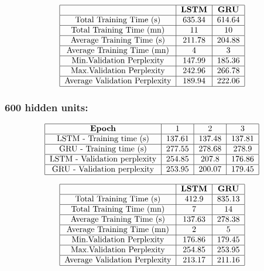 \documentclass[11pt]{article}
\newcommand{\0}{\mat{0}}
\begin{document}
\begin{itemize}
\begin{enumerate}
	  \[
  	 	\begin{tabular}{| c | c | c |}
  	 	 	\hline
	 	 		& \textbf{LSTM} &  \textbf{GRU} \\
	  	 	\hline
	 			Total Training Time (s)		& 635.34 & 614.64 \\
	 	 	\hline
				Total Training Time (mn)		& 11 & 10 \\
			\hline 
				Average Training Time (s)	 	& 211.78 & 204.88 \\
			\hline 
				Average Training Time (mn)	& 4 & 3 \\
			\hline
				Min.Validation Perplexity		& 147.99 & 185.36 \\
			\hline
				Max.Validation Perplexity		& 242.96 & 266.78 \\
			\hline
				Average Validation Perplexity	& 189.94 & 222.06 \\
			\hline
		\end{tabular}
	\] 

	\subsubsection*{\textbf{600 hidden units:}}
	  \[
  	 	\begin{tabular}{| c | c | c | c |}
  	 	 	\hline
	 	 		\textbf{Epoch} & 1 & 2 & 3  \\
	  	 	\hline
	 			LSTM - Training time (s)		& 137.61 & 137.48 & 137.81 \\
	 	 	\hline
				GRU - Training time (s)		& 277.55 & 278.68 & 278.9 \\
			\hline 
				LSTM - Validation perplexity	& 254.85 & 207.8 & 176.86 \\
			\hline 
				GRU - Validation perplexity	& 253.95 & 200.07 & 179.45 \\
			\hline
		\end{tabular}
	\] 

	  \[
  	 	\begin{tabular}{| c | c | c |}
  	 	 	\hline
	 	 		& \textbf{LSTM} &  \textbf{GRU} \\
	  	 	\hline
	 			Total Training Time (s)		& 412.9 & 835.13\\
	 	 	\hline
				Total Training Time (mn)		& 7 & 14 \\
			\hline 
				Average Training Time (s)	 	& 137.63 & 278.38 \\
			\hline 
				Average Training Time (mn)	& 2 & 5 \\
			\hline
				Min.Validation Perplexity		& 176.86 & 179.45 \\
			\hline
				Max.Validation Perplexity		& 254.85 & 253.95 \\
			\hline
				Average Validation Perplexity	& 213.17 & 211.16 \\
			\hline
		\end{tabular}
	\] 



\end{enumerate}
\end{itemize}
\end{document}

